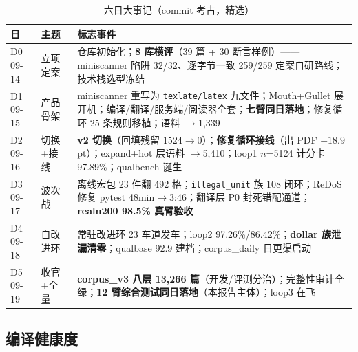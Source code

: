 \begin{table}[htbp]
\centering\small
\caption{六日大事记（commit 考古，精选）}
\label{tab:days}
\begin{tabular}{@{}ll>{\raggedright\arraybackslash}p{9.2cm}@{}}
\toprule
日 & 主题 & 标志事件 \\
\midrule
D0 09-14 & 立项定案 & 仓库初始化；\textbf{8 库横评}（39 篇 + 30 断言样例）——miniscanner 陷阱 32/32、逐字节一致 259/259 定案自研路线；技术栈选型冻结 \\
D1 09-15 & 产品骨架 & miniscanner 重写为 \texttt{texlate/latex} 九文件；Mouth+Gullet 展开机；编译/翻译/服务端/阅读器全套；\textbf{七臂同日落地}；修复循环 25 条规则移植；语料 $\to$1{,}339 \\
D2 09-16 & 切换+接线 & \textbf{v2 切换}（回填残留 1524$\to$0）；\textbf{修复循环接线}（出 PDF $+18.9$pt）；expand+hot 层语料 $\to$5{,}410；loop1 $n$=5124 计分卡 97.89\%；qualbench 诞生 \\
D3 09-17 & 波次战 & 离线宏包 23 件翻 492 格；\texttt{illegal\_unit} 族 108 闭环；ReDoS 修复 pytest 48min$\to$3:46；翻译层 P0 封死错配通道；\textbf{realn200 98.5\% 真臂验收} \\
D4 09-18 & 自改进环 & 常驻改进环 23 车道发车；loop2 97.26\%/86.42\%；\textbf{dollar 族泄漏清零}；qualbase 92.9 建档；corpus\_daily 日更渠启动 \\
D5 09-19 & 收官+全量 & \textbf{corpus\_v3 八层 13{,}266 篇}（开发/评测分治）；完整性审计全绿；\textbf{12 臂综合测试同日落地}（本报告主体）；loop3 在飞 \\
\bottomrule
\end{tabular}
\end{table}

\subsection{编译健康度}

